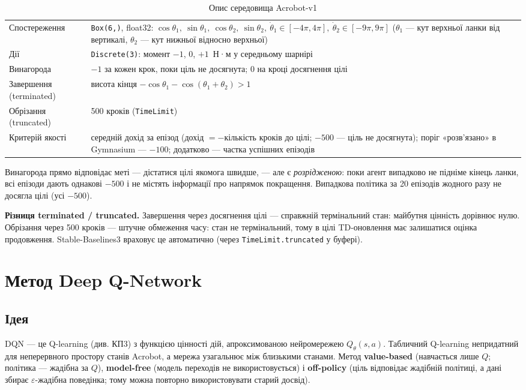 \documentclass[11pt,a4paper]{article}
\newcommand{\code}[1]{\texttt{#1}}
\begin{document}
\begin{table}[H]\centering\small
\begin{tabular}{p{3.6cm}p{12.4cm}}\toprule
Спостереження & \code{Box(6,)}, float32: $\cos\theta_1,\ \sin\theta_1,\ \cos\theta_2,\ \sin\theta_2,\ \dot\theta_1\in[-4\pi,4\pi],\ \dot\theta_2\in[-9\pi,9\pi]$ ($\theta_1$ — кут верхньої ланки від вертикалі, $\theta_2$ — кут нижньої відносно верхньої) \\
Дії & \code{Discrete(3)}: момент $-1$, $0$, $+1$~Н·м у середньому шарнірі \\
Винагорода & $-1$ за кожен крок, поки ціль не досягнута; $0$ на кроці досягнення цілі \\
Завершення (terminated) & висота кінця $-\cos\theta_1-\cos(\theta_1+\theta_2)>1$ \\
Обрізання (truncated) & 500 кроків (\code{TimeLimit}) \\
Критерій якості & середній дохід за епізод (дохід $=-$кількість кроків до цілі; $-500$ — ціль не досягнута); поріг «розв'язано» в Gymnasium — $-100$; додатково — частка успішних епізодів \\ \bottomrule
\end{tabular}
\caption{Опис середовища Acrobot-v1}
\end{table}

Винагорода прямо відповідає меті — дістатися цілі якомога швидше, — але є \emph{розрідженою}: поки агент випадково не підніме кінець ланки, всі епізоди дають однакові $-500$ і не містять інформації про напрямок покращення. Випадкова політика за 20 епізодів жодного разу не досягла цілі (усі $-500$).

\textbf{Різниця terminated / truncated.} Завершення через досягнення цілі — справжній термінальний стан: майбутня цінність дорівнює нулю. Обрізання через 500 кроків — штучне обмеження часу: стан не термінальний, тому в цілі TD-оновлення має залишатися оцінка продовження. Stable-Baselines3 враховує це автоматично (через \code{TimeLimit.truncated} у буфері).

\section{Метод Deep Q-Network}

\subsection{Ідея}
DQN \cite{mnih} — це Q-learning (див. КП3) з функцією цінності дій, апроксимованою нейромережею $Q_\theta(s,a)$. Табличний Q-learning непридатний для неперервного простору станів Acrobot, а мережа узагальнює між близькими станами. Метод \textbf{value-based} (навчається лише $Q$; політика — жадібна за $Q$), \textbf{model-free} (модель переходів не використовується) і \textbf{off-policy} (ціль відповідає жадібній політиці, а дані збирає $\varepsilon$-жадібна поведінка; тому можна повторно використовувати старий досвід).
\end{document}
